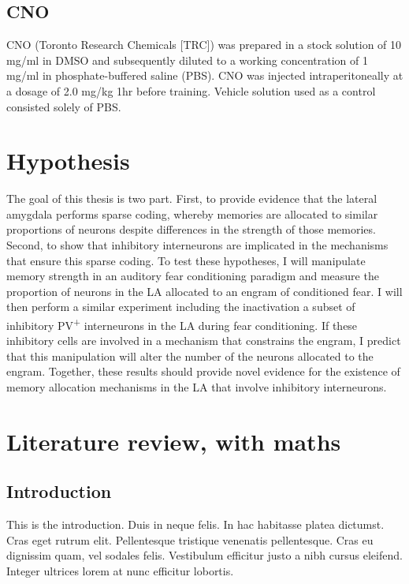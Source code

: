 \documentclass[12pt,a4paper,]{report}
\begin{document}
\section{CNO}\label{cno}

CNO (Toronto Research Chemicals {[}TRC{]}) was prepared in a stock
solution of 10 mg/ml in DMSO and subsequently diluted to a working
concentration of 1 mg/ml in phosphate-buffered saline (PBS). CNO was
injected intraperitoneally at a dosage of 2.0 mg/kg 1hr before training.
Vehicle solution used as a control consisted solely of PBS.  

\chapter{Hypothesis}\label{hypothesis}

The goal of this thesis is two part. First, to provide evidence that the
lateral amygdala performs sparse coding, whereby memories are allocated
to similar proportions of neurons despite differences in the strength of
those memories. Second, to show that inhibitory interneurons are
implicated in the mechanisms that ensure this sparse coding. To test
these hypotheses, I will manipulate memory strength in an auditory fear
conditioning paradigm and measure the proportion of neurons in the LA
allocated to an engram of conditioned fear. I will then perform a
similar experiment including the inactivation a subset of inhibitory
PV\textsuperscript{+} interneurons in the LA during fear conditioning.
If these inhibitory cells are involved in a mechanism that constrains
the engram, I predict that this manipulation will alter the number of
the neurons allocated to the engram. Together, these results should
provide novel evidence for the existence of memory allocation mechanisms
in the LA that involve inhibitory interneurons.

\chapter{Literature review, with
maths}\label{literature-review-with-maths}

\section{Introduction}\label{introduction-1}

This is the introduction. Duis in neque felis. In hac habitasse platea
dictumst. Cras eget rutrum elit. Pellentesque tristique venenatis
pellentesque. Cras eu dignissim quam, vel sodales felis. Vestibulum
efficitur justo a nibh cursus eleifend. Integer ultrices lorem at nunc
efficitur lobortis.
\end{document}
